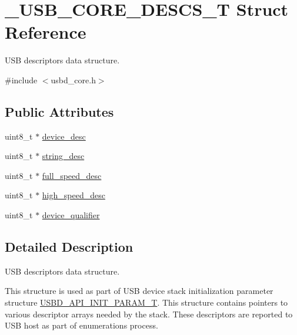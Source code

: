 \hypertarget{struct___u_s_b___c_o_r_e___d_e_s_c_s___t}{}\section{\+\_\+\+U\+S\+B\+\_\+\+C\+O\+R\+E\+\_\+\+D\+E\+S\+C\+S\+\_\+T Struct Reference}
\label{struct___u_s_b___c_o_r_e___d_e_s_c_s___t}


U\+SB descriptors data structure.  




{\ttfamily \#include $<$usbd\+\_\+core.\+h$>$}

\subsection*{Public Attributes}
\begin{DoxyCompactItemize}
\item 
uint8\+\_\+t $\ast$ \hyperlink{struct___u_s_b___c_o_r_e___d_e_s_c_s___t_a15c6d25f9b77c7034439715d769f20f3}{device\+\_\+desc}
\item 
uint8\+\_\+t $\ast$ \hyperlink{struct___u_s_b___c_o_r_e___d_e_s_c_s___t_af785297629e79dec58480668d005c04e}{string\+\_\+desc}
\item 
uint8\+\_\+t $\ast$ \hyperlink{struct___u_s_b___c_o_r_e___d_e_s_c_s___t_adc04768aaa60355fd9934895955b7439}{full\+\_\+speed\+\_\+desc}
\item 
uint8\+\_\+t $\ast$ \hyperlink{struct___u_s_b___c_o_r_e___d_e_s_c_s___t_a99f740c42483df30cc2924383c8a4d2b}{high\+\_\+speed\+\_\+desc}
\item 
uint8\+\_\+t $\ast$ \hyperlink{struct___u_s_b___c_o_r_e___d_e_s_c_s___t_aec1cd64157ed8c38c31b561f6857e6cf}{device\+\_\+qualifier}
\end{DoxyCompactItemize}


\subsection{Detailed Description}
U\+SB descriptors data structure. 

This structure is used as part of U\+SB device stack initialization parameter structure \hyperlink{group___u_s_b_d___core_gaa6e8171941c1ae63afed95974e0f18e3}{U\+S\+B\+D\+\_\+\+A\+P\+I\+\_\+\+I\+N\+I\+T\+\_\+\+P\+A\+R\+A\+M\+\_\+T}. This structure contains pointers to various descriptor arrays needed by the stack. These descriptors are reported to U\+SB host as part of enumerations process.

